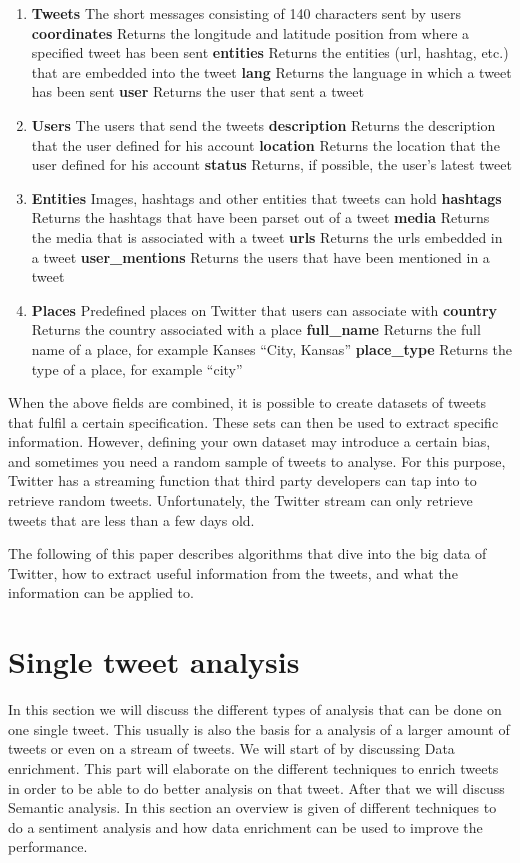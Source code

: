 \documentclass{article}
\begin{document}
\begin{enumerate}
\item \textbf{Tweets} The short messages consisting of 140 characters sent by users
	\subitem \textbf{coordinates} Returns the longitude and latitude position from where a specified tweet has been sent
	\subitem \textbf{entities} Returns the entities (url, hashtag, etc.) that are embedded into the tweet
	\subitem \textbf{lang} Returns the language in which a tweet has been sent
	\subitem \textbf{user} Returns the user that sent a tweet
\item \textbf{Users} The users that send the tweets
	\subitem \textbf{description} Returns the description that the user defined for his account
	\subitem \textbf{location} Returns the location that the user defined for his account
	\subitem \textbf{status} Returns, if possible, the user's latest tweet
\item \textbf{Entities} Images, hashtags and other entities that tweets can hold
	\subitem \textbf{hashtags} Returns the hashtags that have been parset out of a tweet
	\subitem \textbf{media} Returns the media that is associated with a tweet
	\subitem \textbf{urls} Returns the urls embedded in a tweet
	\subitem \textbf{user\_mentions} Returns the users that have been mentioned in a tweet
\item \textbf{Places} Predefined places on Twitter that users can associate with
	\subitem \textbf{country} Returns the country associated with a place
	\subitem \textbf{full\_name} Returns the full name of a place, for example Kanses ``City, Kansas''
	\subitem \textbf{place\_type} Returns the type of a place, for example ``city''
\end{enumerate}

When the above fields are combined, it is possible to create datasets of tweets that fulfil a certain specification. These sets can then be used to extract specific information. However, defining your own dataset may introduce a certain bias, and sometimes you need a random sample of tweets to analyse. For this purpose, Twitter has a streaming function that third party developers can tap into to retrieve random tweets. Unfortunately, the Twitter stream can only retrieve tweets that are less than a few days old.

The following of this paper describes algorithms that dive into the big data of Twitter, how to extract useful information from the tweets, and what the information can be applied to.


\section{Single tweet analysis}
In this section we will discuss the different types of analysis that can be done on one single tweet. This usually is also the basis for a analysis of a larger amount of tweets or even on a stream of tweets. We will start of by discussing Data enrichment. This part will elaborate on the different techniques to enrich tweets in order to be able to do better analysis on that tweet. After that we will discuss Semantic analysis. In this section an overview is given of different techniques to do a sentiment analysis and how data enrichment can be used to improve the performance.
\end{document}
